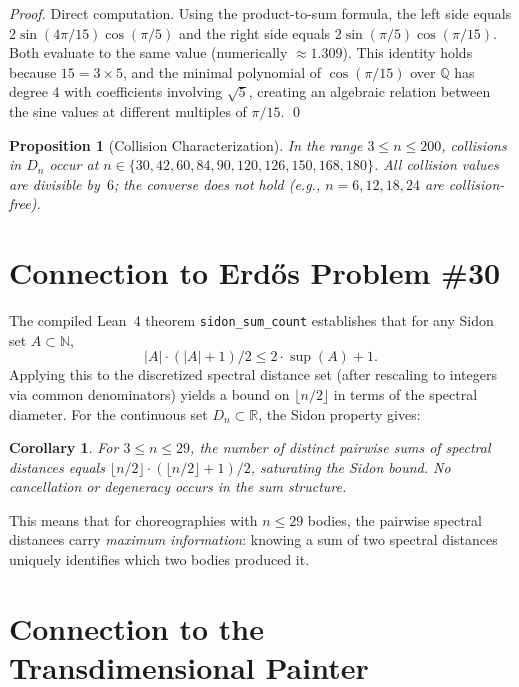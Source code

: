 \documentclass[11pt]{article}
\newtheorem{proposition}[theorem]{Proposition}
\newtheorem{corollary}[theorem]{Corollary}
\theoremstyle{definition}
\theoremstyle{remark}
\begin{document}
\begin{proof}
Direct computation. Using the product-to-sum formula, the left side equals $2\sin(4\pi/15)\cos(\pi/5)$ and the right side equals $2\sin(\pi/5)\cos(\pi/15)$. Both evaluate to the same value (numerically $\approx 1.309$). This identity holds because $15 = 3 \times 5$, and the minimal polynomial of $\cos(\pi/15)$ over $\mathbb{Q}$ has degree 4 with coefficients involving $\sqrt{5}$, creating an algebraic relation between the sine values at different multiples of $\pi/15$. \qed
\end{proof}

\begin{proposition}[Collision Characterization]\label{prop:collision_char}
In the range $3 \leq n \leq 200$, collisions in $D_n$ occur at $n \in \{30, 42, 60, 84, 90, 120, 126, 150, 168, 180\}$. All collision values are divisible by~$6$; the converse does not hold (e.g., $n = 6, 12, 18, 24$ are collision-free).
\end{proposition}

\section{Connection to Erd\H{o}s Problem \#30}

The compiled Lean~4 theorem \texttt{sidon\_sum\_count} \cite{mendoza_sidon_lean} establishes that for any Sidon set $A \subset \mathbb{N}$,
\[
|A| \cdot (|A| + 1) / 2 \leq 2 \cdot \sup(A) + 1.
\]
Applying this to the discretized spectral distance set (after rescaling to integers via common denominators) yields a bound on $\lfloor n/2 \rfloor$ in terms of the spectral diameter. For the continuous set $D_n \subset \mathbb{R}$, the Sidon property gives:

\begin{corollary}\label{cor:sum_bound}
For $3 \leq n \leq 29$, the number of distinct pairwise sums of spectral distances equals $\lfloor n/2 \rfloor \cdot (\lfloor n/2 \rfloor + 1)/2$, saturating the Sidon bound. No cancellation or degeneracy occurs in the sum structure.
\end{corollary}

This means that for choreographies with $n \leq 29$ bodies, the pairwise spectral distances carry \emph{maximum information}: knowing a sum of two spectral distances uniquely identifies which two bodies produced it.

\section{Connection to the Transdimensional Painter}
\end{document}
